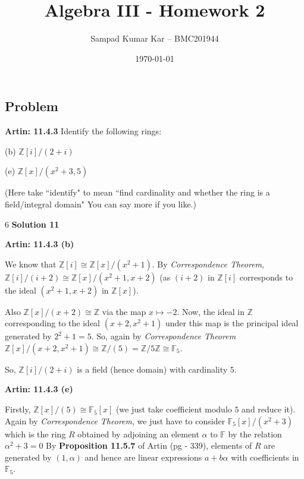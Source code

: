 \documentclass[12pt,a4paper]{article}
\title{Algebra III - Homework 2}
\author{Sampad Kumar Kar -- BMC201944}
\date{\today}
\theoremstyle{definition}
\begin{document}
\maketitle

\begin{flushleft}

\setcounter{section}{10}
\section{Problem}

{\bf Artin: 11.4.3} Identify the following rings:

(b) $\mathbb{Z}[i]/(2+i)$

(e) $\mathbb{Z}[x]/(x^2 +3,5)$

\medskip

(Here take ``identify" to mean ``find cardinality and whether the ring is a field/integral domain" You can say more if you like.)

6
{\bf Solution 11}

\medskip

{\bf Artin: 11.4.3 (b)}

We know that $\mathbb{Z}[i] \cong \mathbb{Z}[x]/(x^2+1) $. By {\it Correspondence Theorem}, $\mathbb{Z}[i]/(i+2) \cong \mathbb{Z}[x]/(x^2+1,x+2) $ (as $(i+2)$ in $\mathbb{Z}[i]$ corresponds to the ideal $(x^2+1,x+2)$ in $\mathbb{Z}[x]$).

Also $\mathbb{Z}[x]/(x+2) \cong \mathbb{Z}$ via the map $x \mapsto -2$. Now, the ideal in $\mathbb{Z}$ corresponding to the ideal $(x+2,x^2+1)$ under this map is the principal ideal generated by $2^2 + 1 = 5$. So, again by {\it Correspondence Theorem} $\mathbb{Z}[x]/(x+2,x^2+1) \cong \mathbb{Z}/(5) = \mathbb{Z}/5\mathbb{Z} \cong \mathbb{F}_5$.

\medskip

So, $\mathbb{Z}[i]/(2+i)$ is a field (hence domain) with cardinality $5$.

\medskip

{\bf Artin: 11.4.3 (e)}

Firstly, $\mathbb{Z}[x]/(5) \cong \mathbb{F}_5[x]$ (we just take coefficient modulo $5$ and reduce it). Again by {\it Correspondence Theorem}, we just have to consider $\mathbb{F}_5[x]/(x^2+3)$ which is the ring $R$ obtained by adjoining an element $\alpha$ to $\mathbb{F}$ by the relation $\alpha^2 +3 = 0$ By {\bf Proposition 11.5.7} of Artin (pg - 339), elements of $R$ are generated by $(1,\alpha)$ and hence are linear expressions $a + b\alpha$ with coefficients in $\mathbb{F}_5$.


\end{flushleft}
\end{document}
